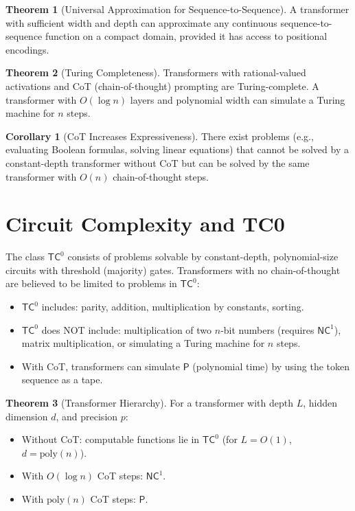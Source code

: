 \documentclass[11pt,a4paper]{book}
\theoremstyle{definition}
\newtheorem{theorem}{Theorem}[chapter]
\newtheorem{corollary}{Corollary}[chapter]
\begin{document}
\begin{theorem}[Universal Approximation for Sequence-to-Sequence]
	A transformer with sufficient width and depth can approximate any continuous sequence-to-sequence function on a compact domain, provided it has access to positional encodings.
\end{theorem}

\begin{theorem}[Turing Completeness]
	Transformers with rational-valued activations and CoT (chain-of-thought) prompting are Turing-complete. A transformer with $O(\log n)$ layers and polynomial width can simulate a Turing machine for $n$ steps.
\end{theorem}

\begin{corollary}[CoT Increases Expressiveness]
	There exist problems (e.g., evaluating Boolean formulas, solving linear equations) that cannot be solved by a constant-depth transformer without CoT but can be solved by the same transformer with $O(n)$ chain-of-thought steps.
\end{corollary}

\section{Circuit Complexity and TC0}

The class $\mathsf{TC}^0$ consists of problems solvable by constant-depth, polynomial-size circuits with threshold (majority) gates. Transformers with no chain-of-thought are believed to be limited to problems in $\mathsf{TC}^0$:

\begin{itemize}
	\item $\mathsf{TC}^0$ includes: parity, addition, multiplication by constants, sorting.
	\item $\mathsf{TC}^0$ does NOT include: multiplication of two $n$-bit numbers (requires $\mathsf{NC}^1$), matrix multiplication, or simulating a Turing machine for $n$ steps.
	\item With CoT, transformers can simulate $\mathsf{P}$ (polynomial time) by using the token sequence as a tape.
\end{itemize}

\begin{theorem}[Transformer Hierarchy]
	For a transformer with depth $L$, hidden dimension $d$, and precision $p$:
	\begin{itemize}
		\item Without CoT: computable functions lie in $\mathsf{TC}^0$ (for $L = O(1)$, $d = \text{poly}(n)$).
		\item With $O(\log n)$ CoT steps: $\mathsf{NC}^1$.
		\item With $\text{poly}(n)$ CoT steps: $\mathsf{P}$.
	\end{itemize}
\end{theorem}
\end{document}
